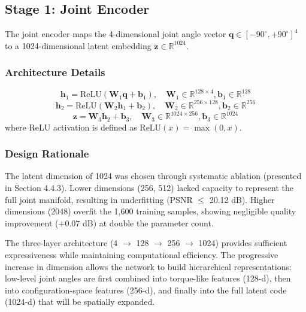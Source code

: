 \documentclass[12pt,a4paper,oneside]{report}
\begin{document}
\subsection{Stage 1: Joint Encoder}

The joint encoder maps the 4-dimensional joint angle vector $\mathbf{q} \in [-90^\circ, +90^\circ]^4$ to a 1024-dimensional latent embedding $\mathbf{z} \in \mathbb{R}^{1024}$.

\subsubsection{Architecture Details}

\begin{equation}
\mathbf{h}_1 = \text{ReLU}(\mathbf{W}_1 \mathbf{q} + \mathbf{b}_1), \quad \mathbf{W}_1 \in \mathbb{R}^{128 \times 4}, \mathbf{b}_1 \in \mathbb{R}^{128}
\end{equation}
\begin{equation}
\mathbf{h}_2 = \text{ReLU}(\mathbf{W}_2 \mathbf{h}_1 + \mathbf{b}_2), \quad \mathbf{W}_2 \in \mathbb{R}^{256 \times 128}, \mathbf{b}_2 \in \mathbb{R}^{256}
\end{equation}
\begin{equation}
\mathbf{z} = \mathbf{W}_3 \mathbf{h}_2 + \mathbf{b}_3, \quad \mathbf{W}_3 \in \mathbb{R}^{1024 \times 256}, \mathbf{b}_3 \in \mathbb{R}^{1024}
\end{equation}
where ReLU activation is defined as $\text{ReLU}(x) = \max(0, x)$.

\subsubsection{Design Rationale}

The latent dimension of 1024 was chosen through systematic ablation (presented in Section 4.4.3). Lower dimensions (256, 512) lacked capacity to represent the full joint manifold, resulting in underfitting (PSNR $\leq$ 20.12 dB). Higher dimensions (2048) overfit the 1,600 training samples, showing negligible quality improvement ($+0.07$ dB) at double the parameter count.

The three-layer architecture (4 $\rightarrow$ 128 $\rightarrow$ 256 $\rightarrow$ 1024) provides sufficient expressiveness while maintaining computational efficiency. The progressive increase in dimension allows the network to build hierarchical representations: low-level joint angles are first combined into torque-like features (128-d), then into configuration-space features (256-d), and finally into the full latent code (1024-d) that will be spatially expanded.
\end{document}
